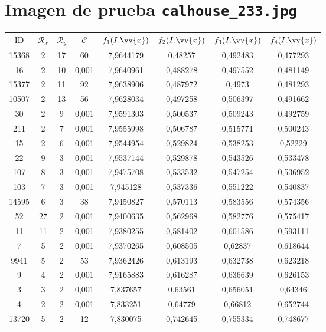 \section{Imagen de prueba \texttt{calhouse\_233.jpg}}

\scriptsize
\begin{longtable}{|c|c|c|c|c|c|c|c|}
\hline
ID & $\mathscr{R}_x$ & $\mathscr{R}_y$ & $\mathscr{C}$ & $f_1(I.\vv{x})$ & $f_2(I.\vv{x})$ & $f_3(I.\vv{x})$ & $f_4(I.\vv{x})$ \\
15368 & 2 & 17 & 60 & 7,9644179 & 0,48257 & 0,492483 & 0,477293 \\
16 & 2 & 10 & 0,001 & 7,9640961 & 0,488278 & 0,497552 & 0,481149 \\
15377 & 2 & 11 & 92 & 7,9638906 & 0,487972 & 0,4973 & 0,481293 \\
10507 & 2 & 13 & 56 & 7,9628034 & 0,497258 & 0,506397 & 0,491662 \\
30 & 2 & 9 & 0,001 & 7,9591303 & 0,500537 & 0,509243 & 0,492759 \\
211 & 2 & 7 & 0,001 & 7,9555998 & 0,506787 & 0,515771 & 0,500243 \\
15 & 2 & 6 & 0,001 & 7,9544954 & 0,529824 & 0,538253 & 0,52229 \\
22 & 9 & 3 & 0,001 & 7,9537144 & 0,529878 & 0,543526 & 0,533478 \\
107 & 8 & 3 & 0,001 & 7,9475708 & 0,533532 & 0,547254 & 0,536952 \\
103 & 7 & 3 & 0,001 & 7,945128 & 0,537336 & 0,551222 & 0,540837 \\
14595 & 6 & 3 & 38 & 7,9450827 & 0,570113 & 0,583556 & 0,574356 \\
52 & 27 & 2 & 0,001 & 7,9400635 & 0,562968 & 0,582776 & 0,575417 \\
11 & 11 & 2 & 0,001 & 7,9380255 & 0,581402 & 0,601586 & 0,593111 \\
7 & 5 & 2 & 0,001 & 7,9370265 & 0,608505 & 0,62837 & 0,618644 \\
9941 & 5 & 2 & 53 & 7,9362426 & 0,613193 & 0,632738 & 0,623218 \\
9 & 4 & 2 & 0,001 & 7,9165883 & 0,616287 & 0,636639 & 0,626153 \\
3 & 3 & 2 & 0,001 & 7,837657 & 0,63561 & 0,656051 & 0,64346 \\
4 & 2 & 2 & 0,001 & 7,833251 & 0,64779 & 0,66812 & 0,652744 \\
13720 & 5 & 2 & 12 & 7,830075 & 0,742645 & 0,755334 & 0,748677 \\

\end{longtable}
